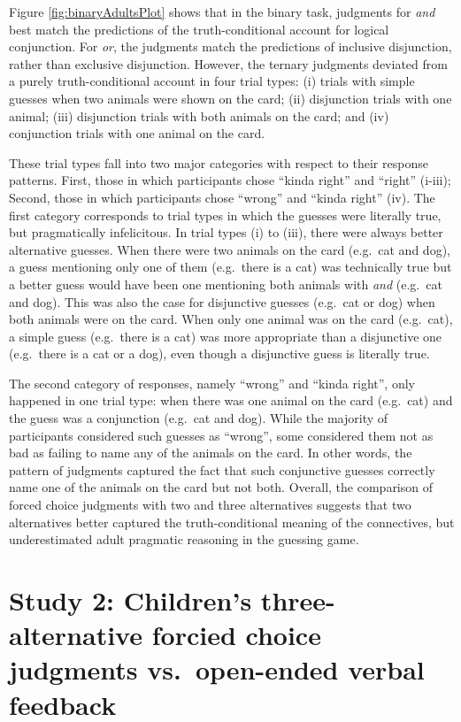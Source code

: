 \documentclass[floatsintext,man]{apa6}
\theoremstyle{definition}
\theoremstyle{definition}
\theoremstyle{definition}
\theoremstyle{remark}
\begin{document}
Figure \ref{fig:binaryAdultsPlot} shows that in the binary task,
judgments for \emph{and} best match the predictions of the
truth-conditional account for logical conjunction. For \emph{or}, the
judgments match the predictions of inclusive disjunction, rather than
exclusive disjunction. However, the ternary judgments deviated from a
purely truth-conditional account in four trial types: (i) trials with
simple guesses when two animals were shown on the card; (ii) disjunction
trials with one animal; (iii) disjunction trials with both animals on
the card; and (iv) conjunction trials with one animal on the card.

These trial types fall into two major categories with respect to their
response patterns. First, those in which participants chose
\enquote{kinda right} and \enquote{right} (i-iii); Second, those in
which participants chose \enquote{wrong} and \enquote{kinda right} (iv).
The first category corresponds to trial types in which the guesses were
literally true, but pragmatically infelicitous. In trial types (i) to
(iii), there were always better alternative guesses. When there were two
animals on the card (e.g.~cat and dog), a guess mentioning only one of
them (e.g.~there is a cat) was technically true but a better guess would
have been one mentioning both animals with \emph{and} (e.g.~cat and
dog). This was also the case for disjunctive guesses (e.g.~cat or dog)
when both animals were on the card. When only one animal was on the card
(e.g.~cat), a simple guess (e.g.~there is a cat) was more appropriate
than a disjunctive one (e.g.~there is a cat or a dog), even though a
disjunctive guess is literally true.

The second category of responses, namely \enquote{wrong} and
\enquote{kinda right}, only happened in one trial type: when there was
one animal on the card (e.g.~cat) and the guess was a conjunction
(e.g.~cat and dog). While the majority of participants considered such
guesses as \enquote{wrong}, some considered them not as bad as failing
to name any of the animals on the card. In other words, the pattern of
judgments captured the fact that such conjunctive guesses correctly name
one of the animals on the card but not both. Overall, the comparison of
forced choice judgments with two and three alternatives suggests that
two alternatives better captured the truth-conditional meaning of the
connectives, but underestimated adult pragmatic reasoning in the
guessing game.

\section{Study 2: Children's three-alternative forcied choice judgments
vs.~open-ended verbal feedback}\label{study2}
\end{document}
